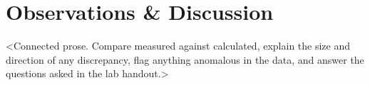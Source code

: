 \documentclass[11pt]{article}
\begin{document}
\section*{Observations \& Discussion}
<Connected prose. Compare measured against calculated, explain the size and
direction of any discrepancy, flag anything anomalous in the data, and answer
the questions asked in the lab handout.>

\end{document}
